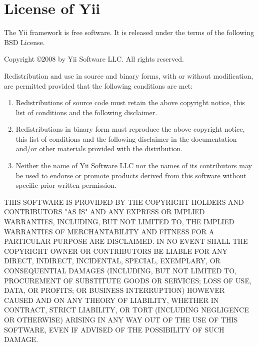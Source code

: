 \chapter*{License of Yii}

The Yii framework is free software. 
It is released under the terms of the following BSD License.

Copyright \copyright 2008 by Yii Software LLC.
All rights reserved.

Redistribution and use in source and binary forms, with or without 
modification, are permitted provided that the following conditions 
are met:
\begin{enumerate}
\item Redistributions of source code must retain the above copyright
      notice, this list of conditions and the following disclaimer.
\item Redistributions in binary form must reproduce the above 
      copyright notice, this list of conditions and the following 
      disclaimer in the documentation and/or other materials provided 
	  with the distribution.
\item Neither the name of Yii Software LLC nor the names of its 
      contributors may be used to endorse or promote products derived 
	  from this software without specific prior written permission.
\end{enumerate}

{\footnotesize
THIS SOFTWARE IS PROVIDED BY THE COPYRIGHT HOLDERS AND CONTRIBUTORS "AS IS" 
AND ANY EXPRESS OR IMPLIED WARRANTIES, INCLUDING, BUT NOT LIMITED TO, THE 
IMPLIED WARRANTIES OF MERCHANTABILITY AND FITNESS FOR A PARTICULAR PURPOSE 
ARE DISCLAIMED. IN NO EVENT SHALL THE COPYRIGHT OWNER OR CONTRIBUTORS BE 
LIABLE FOR ANY DIRECT, INDIRECT, INCIDENTAL, SPECIAL, EXEMPLARY, OR 
CONSEQUENTIAL DAMAGES (INCLUDING, BUT NOT LIMITED TO, PROCUREMENT OF 
SUBSTITUTE GOODS OR SERVICES; LOSS OF USE, DATA, OR PROFITS; OR BUSINESS 
INTERRUPTION) HOWEVER CAUSED AND ON ANY THEORY OF LIABILITY, WHETHER IN 
CONTRACT, STRICT LIABILITY, OR TORT (INCLUDING NEGLIGENCE OR OTHERWISE) 
ARISING IN ANY WAY OUT OF THE USE OF THIS SOFTWARE, EVEN IF ADVISED OF THE 
POSSIBILITY OF SUCH DAMAGE.
}